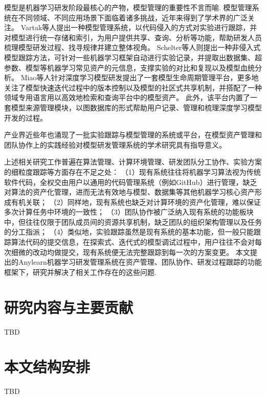 模型是机器学习研发阶段最核心的产物，模型管理的重要性不言而喻. 模型管理系统在不同领域、不同应用场景下面临着诸多挑战\cite{Sch15, Scu15}，近年来得到了学术界的广泛关注。
Vartak等人\cite{Var16}提出一种模型管理系统，以代码侵入的方式对实验进行跟踪，并对模型进行统一存储和索引，为用户提供共享、查询、分析等功能，帮助研发人员梳理模型研发过程、找寻规律并建立整体视角。
Schelter等人\cite{Sch17}则提出一种非侵入式模型跟踪方法，可针对一些机器学习框架自动进行实验记录，并提取出数据集、超参数、模型等机器学习常见资产的元信息，支撑实验的对比和复现以及模型血统分析。
Miao等人\cite{Mia17}针对深度学习模型研发提出了一套模型生命周期管理平台，更多地关注了模型快速迭代过程中的版本控制以及模型的社区式共享机制，并搭配了一种领域专用语言用以高效地检索和查询平台中的模型资产。
此外，该平台内置了一套模型来源管理模块，以图数据库的形式帮助用户记录、管理和梳理深度学习模型开发的过程。

产业界近些年也涌现了一批实验跟踪与模型管理的系统或平台\cite{wandb, neptuneai, huggingface}，在模型资产管理和团队协作上的实践经验对模型研发管理系统的学术研究具有指导意义。

上述相关研究工作普遍在算法管理、计算环境管理、研发团队分工协作、实验方案的细粒度跟踪等方面存在不足之处：
（1）现有系统往往将机器学习算法视为传统软件代码，全权交由用户以通用的代码管理系统（例如GitHub）进行管理，缺乏对算法的资产化管理，进而无法有效地与模型、数据集等其他机器学习核心资产形成有机关联；
（2）同样地，现有系统也缺乏对计算环境的资产化管理，难以保证多次计算任务中环境的一致性；
（3）团队协作被广泛纳入现有系统的功能板块中，但往往仅限于团队成员间的资源共享机制，缺乏团队的组织架构管理以及任务的分工指派；
（4）类似地，实验跟踪虽然是现有系统的基本功能，但一般只能跟踪算法代码的提交信息，在探索式、迭代式的模型调试过程中，用户往往不会对每次细微的改动均做提交，现有系统便无法完整跟踪到每一次的方案变更。
本文提出的Anylearn机器学习研发管理系统在资产管理、团队协作、研发过程跟踪的功能框架下，研究并解决了相关工作存在的这些问题.

%
\section{研究内容与主要贡献}

TBD


%
\section{本文结构安排}

TBD

